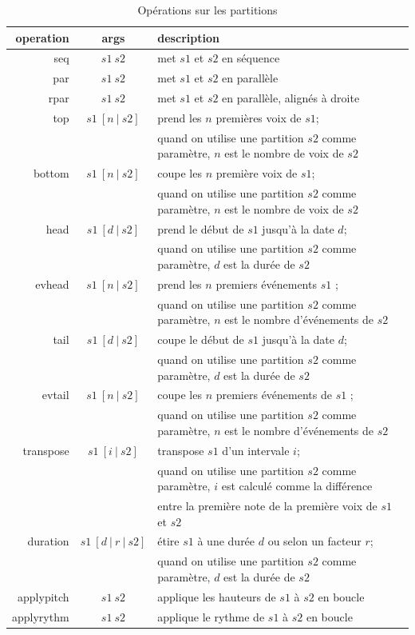 \documentclass{article}
\begin{document}
\begin{table}[htdp]
\begin{center}
\begin{tabular}{rcl}
\hline
operation & args		&	description \\
\hline
seq 	&	$s1\ s2$		& met $s1$ et $s2$ en séquence \\
par 	&	$s1\ s2$		& met $s1$ et $s2$ en parallèle \\ 
rpar	&	$s1\ s2$		& met $s1$ et $s2$ en parallèle, alignés à droite \\
top 	&	$s1\ [n\ | \ s2]$ 	& prend les $n$ premières voix de $s1$; \\
		&	& quand  on utilise une partition $s2$ comme paramètre, $n$ est le nombre de voix de $s2$ \\
bottom 	&	$s1\ [n\ | \ s2]$ 	& coupe les $n$ première voix de $s1$;  \\
		&	& quand  on utilise une partition $s2$ comme paramètre, $n$ est le nombre de voix de $s2$ \\
head	& 	$s1\ [d\ | \ s2]$	& prend le début de $s1$ jusqu'à la date $d$; \\
		& 	& quand  on utilise une partition $s2$ comme paramètre, $d$ est la durée de $s2$ \\
evhead 	&	$s1\ [n\ | \ s2]$	& prend les $n$ premiers événements $s1$ ; \\
		& 	& quand  on utilise une partition $s2$ comme paramètre, $n$ est le nombre d'événements de $s2$ \\
tail	&	$s1\ [d\ | \ s2]$ 	& coupe le début de $s1$ jusqu'à la date $d$; \\
		& 	& quand  on utilise une partition $s2$ comme paramètre, $d$ est la durée de $s2$ \\
evtail 	&	$s1\ [n\ | \ s2]$ 	& coupe les $n$ premiers événements de $s1$ ; \\
		& 	& quand  on utilise une partition $s2$ comme paramètre, $n$ est le nombre d'événements de $s2$ \\
transpose 	&	$s1\ [i\ | \ s2]$	& transpose $s1$ d'un intervale $i$; \\
			& 	& quand  on utilise une partition $s2$ comme paramètre, $i$ est calculé comme la différence  \\
			& 	& entre la première note de la première voix de $s1$ et $s2$ \\
duration 	&	$s1\ [d\ |\ r\ |\ s2]$	& étire $s1$ à une durée $d$ ou selon un facteur $r$; \\
			& 	& quand  on utilise une partition $s2$ comme paramètre, $d$ est la durée de $s2$ \\
applypitch 	&	$s1\ s2$	& applique les hauteurs de $s1$ à $s2$ en boucle \\
applyrythm 	&	$s1\ s2$	& applique le rythme de $s1$ à $s2$ en boucle \\
\hline
\end{tabular}
\end{center}
\caption{Opérations sur les partitions}
\label{operations}
\end{table}
\end{document}
